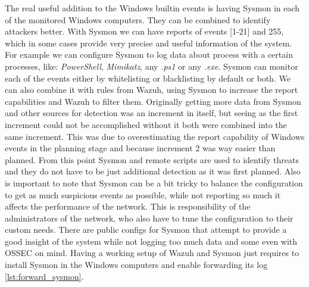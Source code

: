 \linej
The real useful addition to the Windows builtin events is having Sysmon\cite{sysmon} in each of the monitored Windows computers. They can be combined to identify attackers better\cite{detection_events}.
\linej
With Sysmon we can have reports of events [1-21] and 255, which in some cases provide very precise and useful information of the system. For example we can configure Sysmon to log data about process with a certain processes, like: \textit{PowerShell}, \textit{Mimikatz}, any \textit{.ps1} or any \textit{.exe}.
Sysmon can monitor each of the events either by whitelisting or blacklisting by default or both. We can also combine it with rules from Wazuh, using Sysmon to increase the report capabilities and Wazuh to filter them.
\linej
\linej
\label{increment_explanation}
Originally getting more data from Sysmon and other sources for detection was an increment in itself, but seeing as the first increment could not be accomplished without it both were combined into the same increment.
This was due to overestimating the report capability of Windows events in the planning stage and because increment 2 was way easier than planned.
From this point Sysmon and remote scripts are used to identify threats and they do not have to be just additional detection as it was first planned.
\linej
\linej
Also is important to note that Sysmon can be a bit tricky to balance the configuration to get as much suspicious events as possible, while not reporting so much it affects the performance of the network. This is responsibility of the administrators of the network, who also have to tune the configuration to their custom needs.
There are public configs for Sysmon that attempt to provide a good insight of the system while not logging too much data\cite{sysmon_config} and some even with OSSEC on mind\cite{ossec_sysmon}.
\linej
\linej
Having a working setup of Wazuh and Sysmon just requires to install Sysmon in the Windows computers and enable forwarding its log \ref{lst:forward_sysmon}.


